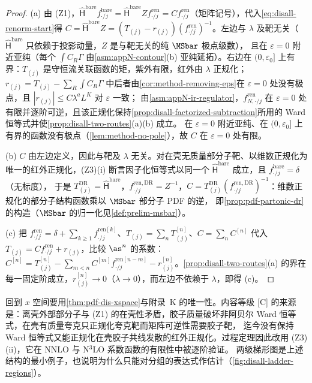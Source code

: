 \begin{proof}
(a) 由 (Z1)，$\hat{\mathsf H}^{\mathrm{bare}}f^{\mathrm{bare}}_{\cdot/j}=\hat{\mathsf H}^{\mathrm{bare}}Zf^{\mathrm{ren}}_{\cdot/j}=Cf^{\mathrm{ren}}_{\cdot/j}$（矩阵记号），代入\cref{eq:disall-renorm-start}得
$C=\hat{\mathsf H}^{\mathrm{bare}}Z=(T_{(j)}-r_{(j)})(f^{\mathrm{ren}}_{\cdot/j})^{-1}$。左边与 $\lambda$ 及靶无关（$\hat{\mathsf H}^{\mathrm{bare}}$ 只依赖于投影动量，$Z$ 是与靶无关的纯 $\MSbar$ 极点级数），
且在 $\varepsilon=0$ 附近亚纯（每个 $\int C_R\Gamma$ 由\cref{asm:appN-contour}(b) 亚纯延拓）。右边在 $(0,\varepsilon_0]$ 上有界：$T_{(j)}$ 是守恒流关联函数的矩，紫外有限，红外由 $\lambda$ 正规化；
$r_{(j)}=T_{(j)}-\sum_R\int C_R\Gamma$ 中后者由\cref{cor:method-removing-eps}在 $\varepsilon=0$ 处没有极点，且 $|r_{(j)}|\le C\lambda^aL^K$ 对 $\varepsilon$ 一致；
由\cref{asm:appN-ir-regulator}，$f^{\mathrm{ren}}_{N,\cdot/j}$ 在 $\varepsilon=0$ 处有限并逐阶可逆，且该正规化保持\cref{prop:disall-factorized-subtraction}所用的 Ward 恒等式并使\cref{prop:disall-two-routes}(a)(b) 成立。
在 $\varepsilon=0$ 附近亚纯、在 $(0,\varepsilon_0]$ 上有界的函数没有极点（\cref{lem:method-no-pole}），故 $C$ 在 $\varepsilon=0$ 处有限。

(b) $C$ 由左边定义，因此与靶及 $\lambda$ 无关。对在壳无质量部分子靶、以维数正规化为唯一的红外正规化，(Z3)(i) 断言因子化恒等式以同一个 $\hat{\mathsf H}^{\mathrm{bare}}$ 成立，且 $f^{\mathrm{bare}}_{\cdot/j}=\delta$（无标度），
于是 $T^{\mathrm{DR}}_{(j)}=\hat{\mathsf H}^{\mathrm{bare}}$，$f^{\mathrm{ren,DR}}_{\cdot/j}=Z^{-1}$，$C=T^{\mathrm{DR}}_{(j)}(f^{\mathrm{ren,DR}}_{\cdot/j})^{-1}$：维数正规化的部分子结构函数乘以 $\MSbar$ 部分子 PDF 的逆，
即\cref{prop:pdf-partonic-dr}的构造（$\MSbar$ 的归一化见\cref{def:prelim-msbar}）。

(c) 把 $f^{\mathrm{ren}}_{\cdot/j}=\delta+\sum_{k\ge1}f^{\mathrm{ren}[k]}_{\cdot/j}$、$T_{(j)}=\sum_nT^{[n]}_{(j)}$、$C=\sum_nC^{[n]}$ 代入 $T_{(j)}=Cf^{\mathrm{ren}}_{\cdot/j}+r_{(j)}$，比较 $\as^n$ 的系数：
$C^{[n]}=T^{[n]}_{(j)}-\sum_{m<n}C^{[m]}f^{\mathrm{ren}[n-m]}_{\cdot/j}-r^{[n]}_{(j)}$。\cref{prop:disall-two-routes}(a) 的界在每一固定阶成立，$r^{[n]}_{(j)}\to0$（$\lambda\to0$），而左边不依赖于 $\lambda$，即得 (c)。
\end{proof}

\noindent
回到 $x$ 空间要用\cref{thm:pdf-dis-xspace}与附录~K 的唯一性。内容等级 [C] 的来源是：离壳外部部分子与 (Z1) 的在壳性矛盾，胶子质量破坏非阿贝尔 Ward 恒等式，在壳有质量夸克只正规化夸克靶而矩阵可逆性需要胶子靶，
迄今没有保持 Ward 恒等式又能正规化在壳胶子共线发散的红外正规化。过程定理因此改用 (Z3)(ii)，它在 NNLO 与 N$^3$LO 系数函数的有限性中被逐阶验证。
两级梯形图是上述结构的最小例子，也说明为什么只能对分组的表达式作估计（\cref{fig:disall-ladder-regions}）。

